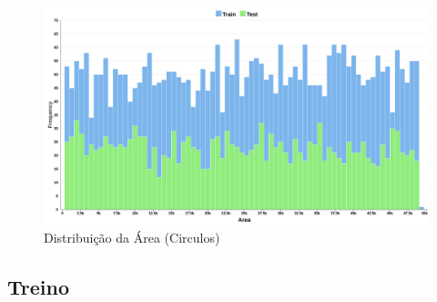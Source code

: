     \begin{figure}[H]
        \centering
        \includegraphics[width=1.0\linewidth]{imgs/Test_9/dataset_9/Circles_Area_Distribution_Hist.png}
        \caption{Distribuição da Área (Circulos)}
        \label{fig:enter-label}
    \end{figure}

\subsection{Treino}

